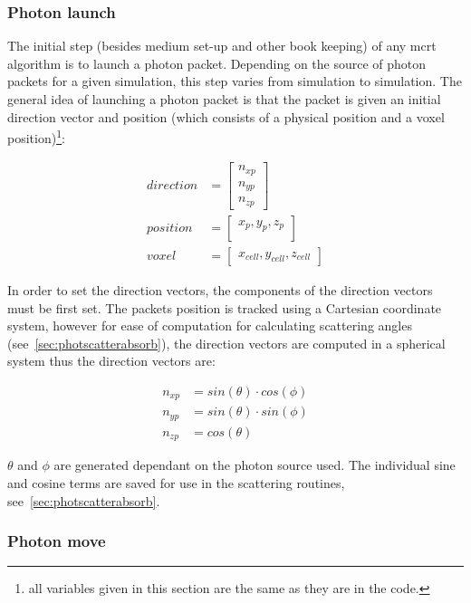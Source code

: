 \subsubsection{Photon launch}\label{sec:photlaunch}

The initial step (besides medium set-up and other book keeping) of any \gls{mcrt} algorithm is to launch a photon packet. Depending on the source of photon packets for a given simulation, this step varies from simulation to simulation. The general idea of launching a photon packet is that the packet is given an initial direction vector and position (which consists of a physical position and a voxel position)\footnote{all variables given in this section are the same as they are in the code.}:

\begin{align}
	direction &= \begin{bmatrix}
		n_{xp}\\
		n_{yp}\\
		n_{zp}
	\end{bmatrix}\\
	position &= \begin{bmatrix}
		x_p, y_p, z_p\\
	\end{bmatrix}\\
	voxel &= \begin{bmatrix}
		x_{cell}, y_{cell}, z_{cell}
	\end{bmatrix}	 
\end{align}

In order to set the direction vectors, the components of the direction vectors must be first set. The packets position is tracked using a Cartesian coordinate system, however for ease of computation for calculating scattering angles (see~\cref{sec:photscatterabsorb}), the direction vectors are computed in a spherical system thus the direction vectors are: 

\begin{align}
n_{xp} &= sin(\theta) \cdot cos(\phi) \\
n_{yp} &= sin(\theta) \cdot sin(\phi) \\
n_{zp} &= cos(\theta)
\end{align}

$\theta$ and $\phi$ are generated dependant on the photon source used. The individual sine and cosine terms are saved for use in the scattering routines, see~\cref{sec:photscatterabsorb}.

\subsubsection{Photon move}\label{sec:photmove}

